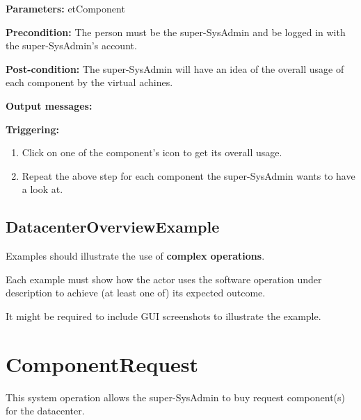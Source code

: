 \begin{description}

\item \textbf{Parameters:} etComponent
\item \textbf{Precondition:} The person must be the super-SysAdmin and be logged
in with the super-SysAdmin's account.
\item \textbf{Post-condition:} The super-SysAdmin will have an idea of the
overall usage of each component by the virtual achines.
\item \textbf{Output messages:}

\item \textbf{Triggering:}
\begin{enumerate}
\item Click on one of the component's icon to get its overall usage.
\item Repeat the above step for each component the super-SysAdmin wants to have a
look at.
\end{enumerate}

 
\end{description}

 
\subsection{DatacenterOverviewExample}
Examples should illustrate the use of \textbf{complex operations}.

Each example must show how the actor uses the software operation under
description to achieve (at least one of) its expected outcome.

It might be required to include GUI screenshots to illustrate the example.






\section{ComponentRequest}
\label{operation:componentrequest}
This system operation allows the super-SysAdmin to buy request component(s) for
the datacenter.

